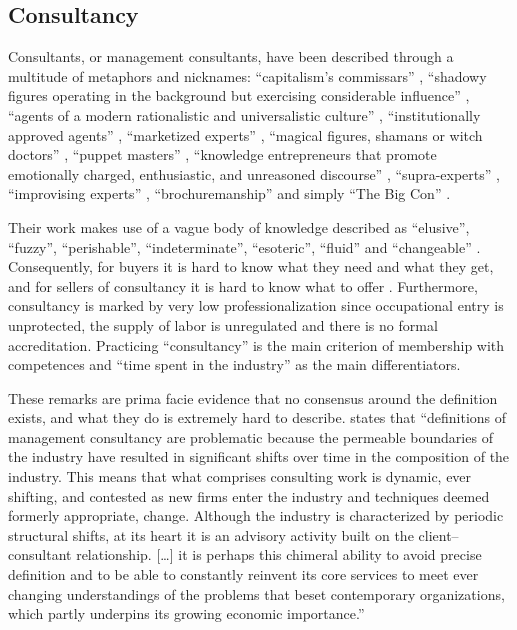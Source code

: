 \documentclass[12pt]{article}
\begin{document}
\subsection{Consultancy}\label{consultancy}

Consultants, or management consultants, have been described through a
multitude of metaphors and nicknames: ``capitalism's commissars''
\citep[ 93]{thrift2005}, ``shadowy figures operating in the background
but exercising considerable influence'' \citep[ 31]{kipping2012},
``agents of a modern rationalistic and universalistic culture'' \citep[
190]{kipping2012}, ``institutionally approved agents'' \citep[
193]{kipping2012}, ``marketized experts'' \citep[ 265]{furusten2012},
``magical figures, shamans or witch doctors'' \citep[ 68]{fincham2002},
``puppet masters'' \citep[ 69]{fincham2002}, ``knowledge entrepreneurs
that promote emotionally charged, enthusiastic, and unreasoned
discourse'' \citep[ 37]{leicht2006}, ``supra-experts'' \citep[
94]{kieser2006}, ``improvising experts'' \citep[ 272]{furusten2009},
``brochuremanship'' \citep[ 75]{levine1982} and simply ``The Big Con''
\citep{mazzucato2023}.

Their work makes use of a vague body of knowledge described as
``elusive'', ``fuzzy'', ``perishable'', ``indeterminate'', ``esoteric'',
``fluid'' and ``changeable'' \citep{muzio2011}. Consequently, for buyers
it is hard to know what they need and what they get, and for sellers of
consultancy it is hard to know what to offer \citep[ 266]{furusten2012}.
Furthermore, consultancy is marked by very low professionalization since
occupational entry is unprotected, the supply of labor is unregulated
and there is no formal accreditation. \citep[ 20]{fincham2006}
Practicing ``consultancy'' is the main criterion of membership with
competences and ``time spent in the industry'' as the main
differentiators.

These remarks are prima facie evidence that no consensus around the
definition exists, and what they do is extremely hard to describe.
\citet[24]{kipping2012} states that ``definitions of management
consultancy are problematic because the permeable boundaries of the
industry have resulted in significant shifts over time in the
composition of the industry. This means that what comprises consulting
work is dynamic, ever shifting, and contested as new firms enter the
industry and techniques deemed formerly appropriate, change. Although
the industry is characterized by periodic structural shifts, at its
heart it is an advisory activity built on the client--consultant
relationship. {[}\ldots{]} it is perhaps this chimeral ability to avoid
precise definition and to be able to constantly reinvent its core
services to meet ever changing understandings of the problems that beset
contemporary organizations, which partly underpins its growing economic
importance.''
\end{document}
